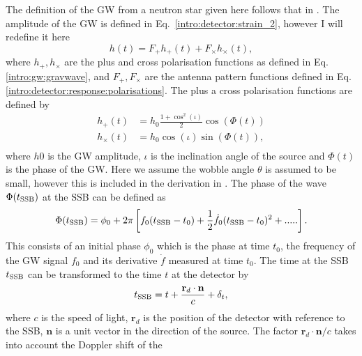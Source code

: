 The definition of the \gls{GW} from a neutron star given here follows that in
\citep{riles2017RecentSearches,schutz1998DataAnalysis,dupuis2005BayesianEstimation}.
The amplitude of the \gls{GW} is defined in Eq.~\ref{intro:detector:strain_2}, however I will redefine it here
%
\begin{equation}
\label{searchcw:model:amplitude}
h(t) = F_{+}h_{+}(t) + F_{\times}h_{\times}(t),
\end{equation}
%
where $h_{+},h_{\times}$ are the plus and cross polarisation functions as defined in
Eq.\ref{intro:gw:gravwave}, and $F_{+},F_{\times}$ are the antenna pattern
functions  defined in Eq.\ref{intro:detector:response:polarisations}. The plus a cross polarisation functions are defined by
%
\begin{equation}
\label{intro:cw:amplitudes}
    \begin{split}
        h_{+}(t) &=  h_0 \frac{1 + \cos^2{(\iota)}}{2}\cos{\left(\Phi(t)\right)} \\
        h_{\times}(t) &= h_0  \cos{(\iota)} \sin{\left( \Phi(t)\right) }, \\
    \end{split}
\end{equation}
%
where $h0$ is the \gls{GW} amplitude, $\iota$ is the inclination angle of the source and $\Phi(t)$ is the phase of the \gls{GW}. 
Here we assume the wobble angle $\theta$ is assumed to be small,
however this is included in the derivation in \citep{schutz1998DataAnalysis}.
The phase of the wave $\Phi(t_{{\rm SSB}})$ at the \gls{SSB} can be defined as
%
\begin{equation}
\label{searchcw:model:phase}
    \Phi(t_{{\rm SSB}}) = \phi_0 + 2\pi\left[ f_0(t_{{\rm SSB}} - t_0) + \frac{1}{2} \dot{f_0} (t_{{\rm SSB}} - t_0)^2 + .....\right] .
\end{equation}
%
This consists of an initial phase $\phi_0$ which is the phase at time $t_0$,
the frequency of the \gls{GW} signal $f_0$ and its derivative ${\dot{f}}$ measured at
time $t_0$. The time at the \gls{SSB} $t_{{\rm SSB}}$ can be
transformed to the time $t$ at the detector by
%
\begin{equation}
	\label{searchcw:model:ssbtime}
t_{{\rm SSB}} = t + \frac{\mathbf{r}_d \cdot \mathbf{n}}{c} + \delta_t,
\end{equation}
%
where $c$ is the speed of light, $\mathbf{r}_d$ is the position of the detector with reference to the
\gls{SSB}, $\mathbf{n}$ is a unit vector in the direction of the source. The factor $\mathbf{r}_d \cdot \mathbf{n}/c$ takes into account the Doppler shift of the
